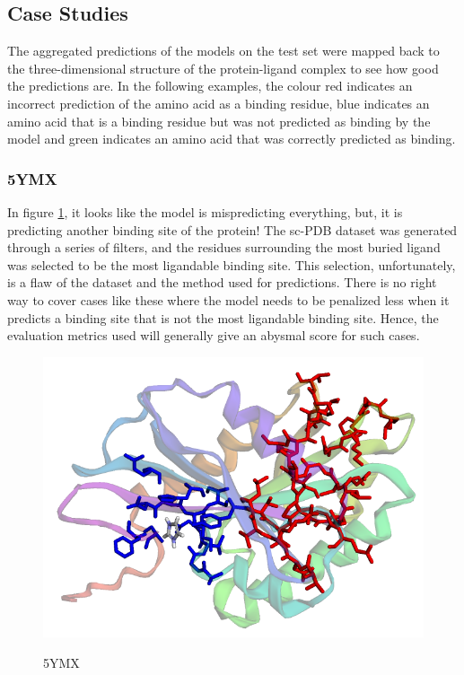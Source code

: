 \documentclass[journal=jacsat,manuscript=article]{achemso}
\begin{document}
\subsection{Case Studies}
\quad The aggregated predictions of the models on the test set were mapped back to the three-dimensional structure of the protein-ligand complex to see how good the predictions are. In the following examples, the colour red indicates an incorrect prediction of the amino acid as a binding residue, blue indicates an amino acid that is a binding residue but was not predicted as binding by the model and green indicates an amino acid that was correctly predicted as binding.

\subsubsection{5YMX}
\quad In figure \ref{fig:5ymx}, it looks like the model is mispredicting everything, but, it is predicting another binding site of the protein! The sc-PDB dataset was generated through a series of filters, and the residues surrounding the most buried ligand was selected to be the most ligandable binding site. This selection, unfortunately, is a flaw of the dataset and the method used for predictions. There is no right way to cover cases like these where the model needs to be penalized less when it predicts a binding site that is not the most ligandable binding site. Hence, the evaluation metrics used will generally give an abysmal score for such cases.
\begin{figure}
    \caption{\centering 5YMX}
    \centering
    \noindent\includegraphics[scale=0.4]{5ymx.png}
    \label{fig:5ymx}
\end{figure}
\end{document}
